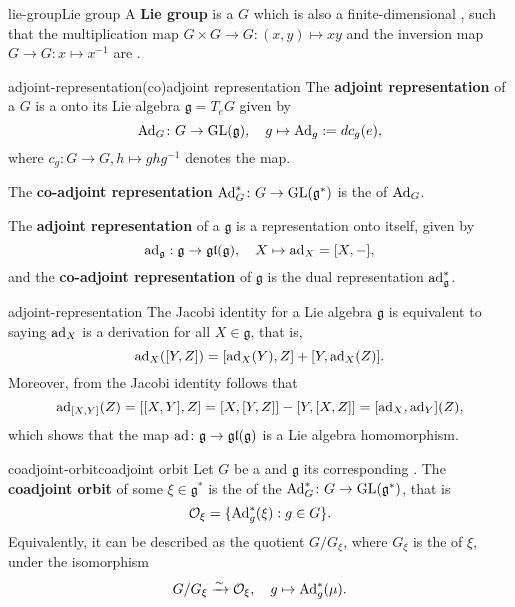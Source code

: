 \begin{topic}{lie-group}{Lie group}
    A \textbf{Lie group} is a  $G$ which is also a finite-dimensional , such that the multiplication map $G \times G \to G \colon (x, y) \mapsto xy$ and the inversion map $G \to G : x \mapsto x^{-1}$ are .
\end{topic}

\begin{topic}{adjoint-representation}{(co)adjoint representation}
    The \textbf{adjoint representation} of a  $G$ is a  onto its Lie algebra $\mathfrak{g} = T_e G$ given by
    \[ \textup{Ad}_G \colon G \to \textup{GL}(\mathfrak{g}), \quad g \mapsto \textup{Ad}_g := d c_g(e) , \]
    where $c_g \colon G \to G, h \mapsto g h g^{-1}$ denotes the  map.
    
    The \textbf{co-adjoint representation} $\textup{Ad}_G^* \colon G \to \textup{GL}(\mathfrak{g}^*)$ is the  of $\textup{Ad}_G$.
    
    The \textbf{adjoint representation} of a  $\mathfrak{g}$ is a representation onto itself, given by
    \[ \textup{ad}_{\mathfrak{g}}: \mathfrak{g} \to \mathfrak{gl}(\mathfrak{g}), \quad X \mapsto \textup{ad}_X = [X, -] , \]
    and the \textbf{co-adjoint representation} of $\mathfrak{g}$ is the dual representation $\textup{ad}_{\mathfrak{g}}^*$.
\end{topic}

\begin{example}{adjoint-representation}
    The Jacobi identity for a Lie algebra $\mathfrak{g}$ is equivalent to saying $\textup{ad}_X$ is a derivation for all $X \in \mathfrak{g}$, that is,
    \[ \textup{ad}_X([Y, Z]) = [\textup{ad}_X(Y), Z] + [Y, \textup{ad}_X(Z)] . \]
    Moreover, from the Jacobi identity follows that
    \[ \textup{ad}_{[X, Y]}(Z) = [[X, Y], Z] = [X, [Y, Z]] - [Y, [X, Z]] = [\textup{ad}_X, \textup{ad}_Y](Z) , \]
    which shows that the map $\textup{ad} \colon \mathfrak{g} \to \mathfrak{gl}(\mathfrak{g})$ is a Lie algebra homomorphism.
\end{example}

\begin{topic}{coadjoint-orbit}{coadjoint orbit}
    Let $G$ be a  and $\mathfrak{g}$ its corresponding . The \textbf{coadjoint orbit} of some $\xi \in \mathfrak{g}^*$ is the  of the  $\textup{Ad}^*_G \colon G \to \textup{GL}(\mathfrak{g}^*)$, that is
    \[ \mathcal{O}_\xi = \{ \textup{Ad}_g^*(\xi) : g \in G \} . \]
    Equivalently, it can be described as the quotient $G/G_\xi$, where $G_\xi$ is the  of $\xi$, under the isomorphism
    \[ G/G_\xi \xrightarrow{\sim} \mathcal{O}_\xi, \quad g \mapsto \textup{Ad}_g^*(\mu) . \]
\end{topic}

